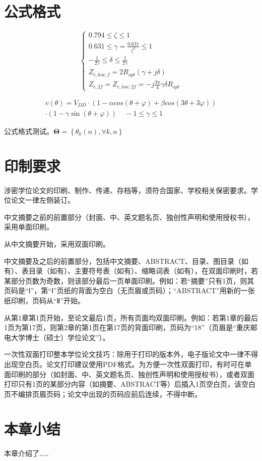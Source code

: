 \section{公式格式}

\begin{equation}
\left\{ \begin{aligned}
0.794 \le \zeta  \le 1 ~~~~~~~~~~~\\
0.631 \le \gamma  = \frac{{0.631}}{{{\zeta ^2}}} \le 1~~~~~~ \\
- \frac{1}{{2\gamma }} \le \delta  \le \frac{1}{{2\gamma }}~~~~~~~~~~~ \\
{Z_{c,low,f}} = 2{R_{opt}}(\gamma  + j\delta )~~~~~\\
{Z_{c,2f}} = {Z_{c,low,2f}} =  - j\frac{{3\pi }}{4}\gamma \delta {R_{opt}}
\end{aligned} \right.
\label{eq:3.1}
\end{equation}

\begin{equation}
\begin{aligned}
v(\theta ) = V_{DD}\cdot(1 - \alpha cos(\theta  + \varphi ) + \beta cos(3\theta  + 3\varphi ))\\
\cdot(1 - \gamma \sin (\theta  + \varphi )) ~~~~~- 1 \le \gamma  \le 1\
\end{aligned}
\label{eq:vd}
\end{equation}




\noindent
公式格式测试。${\mathbf{\Theta }} = \left\{ {{\theta _k}\left( n \right),\forall k,n} \right\}$

\section{印制要求}
涉密学位论文的印刷、制作、传递、存档等，须符合国家、学校相关保密要求。学位论文一律左侧装订。

中文摘要之前的前置部分（封面、中、英文题名页、独创性声明和使用授权书），采用单面印刷。

从中文摘要开始，采用双面印刷。

中文摘要及之后的前置部分，包括中文摘要、ABSTRACT、目录、图目录（如有）、表目录（如有）、主要符号表（如有）、缩略词表（如有），在双面印刷时，若某部分页数为奇数，则该部分最后一页单面印刷。例如：若“摘要”只有1页，则其页码是“Ⅰ”，第“Ⅰ”页纸的背面为空白（无页眉或页码）；“ABSTRACT”用新的一张纸印刷，页码从“Ⅱ”开始。

从第1章第1页开始，至论文最后1页，所有页面均双面印刷。例如：若第1章的最后1页为第17页，则第2章的第1页在第17页的背面印刷，页码为“18”（页眉是“重庆邮电大学博士（硕士）学位论文”）。

一次性双面打印整本学位论文技巧：除用于打印的版本外，电子版论文中一律不得出现空白页。论文打印建议使用PDF格式。为方便一次性双面打印，有时可在单面印刷的部分（如封面、中、英文题名页、独创性声明和使用授权书），或者双面打印只有1页的某部分内容（如摘要、ABSTRACT等）后插入1页空白页，该空白页不编排页眉页码；论文中出现的页码应前后连续，不得中断。


\section{本章小结}
本章介绍了……
